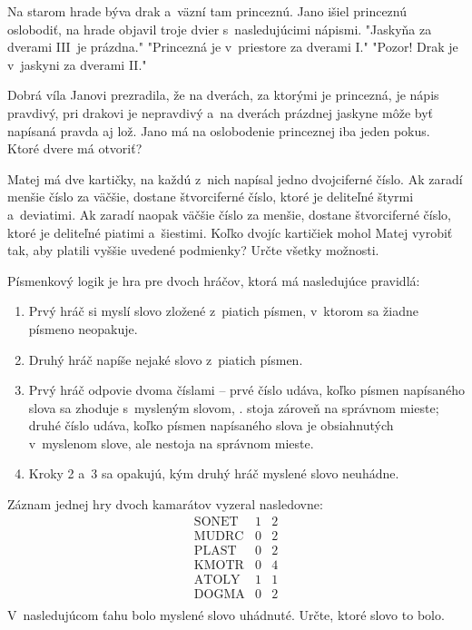 {%
Na starom hrade býva drak a~väzní tam princeznú.
Jano išiel princeznú oslobodiť, na hrade objavil troje dvier s~nasledujúcimi
nápismi.
 "Jaskyňa za dverami III~je prázdna."
 "Princezná je v~priestore za dverami I."
 "Pozor! Drak je v~jaskyni za dverami II."

Dobrá víla Janovi prezradila, že na dverách, za ktorými je princezná, je
nápis pravdivý, pri drakovi je nepravdivý a~na dverách prázdnej jaskyne môže byť
napísaná pravda aj lož.
Jano má na oslobodenie princeznej iba jeden pokus. Ktoré dvere má otvoriť?
}

{%
Matej má dve kartičky, na každú z~nich napísal jedno dvojciferné číslo.
Ak zaradí menšie číslo za väčšie, dostane štvorciferné číslo, ktoré je deliteľné
štyrmi a~deviatimi.
Ak zaradí naopak väčšie číslo za menšie, dostane štvorciferné číslo, ktoré je
deliteľné piatimi a~šiestimi.
Koľko dvojíc kartičiek mohol Matej vyrobiť tak, aby platili vyššie uvedené
podmienky? Určte všetky možnosti.}

{%
Písmenkový logik je hra pre dvoch hráčov, ktorá má nasledujúce pravidlá:
\begin{enumerate}
  \item Prvý hráč si myslí slovo zložené z~piatich písmen, v~ktorom sa žiadne písmeno
    neopakuje.
  \item Druhý hráč napíše nejaké slovo z~piatich písmen.
  \item Prvý hráč odpovie dvoma číslami --
    prvé číslo udáva, koľko písmen napísaného slova sa zhoduje s~mysleným
    slovom, \tj. stoja zároveň na správnom mieste;
    druhé číslo udáva, koľko písmen napísaného slova je obsiahnutých v~myslenom
    slove, ale nestoja na správnom mieste.
  \item Kroky 2 a~3 sa opakujú, kým druhý hráč myslené slovo neuhádne.
\end{enumerate}
Záznam jednej hry dvoch kamarátov vyzeral nasledovne:
$$
\begin{array}{ccc}
\text{SONET} & 1 & 2 \\
\text{MUDRC} & 0 & 2 \\
\text{PLAST} & 0 & 2 \\
\text{KMOTR} & 0 & 4 \\
\text{ATOLY} & 1 & 1 \\
\text{DOGMA} & 0 & 2 \\
\end{array}
$$
V~nasledujúcom ťahu bolo myslené slovo uhádnuté.
Určte, ktoré slovo to bolo.
}

